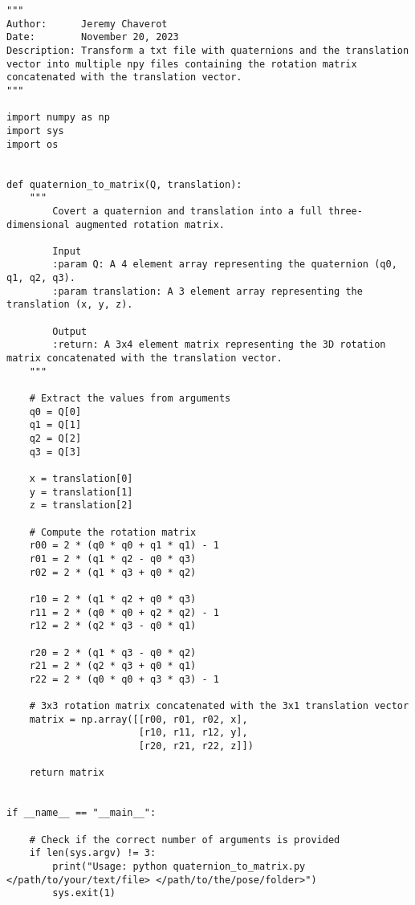 \begin{lstlisting}[style=pythonstyle, label=lst:4, caption=Python script \texttt{quaternion\_to\_matrix.py} to transform a txt file with quaternions and the translation vector into multiple npy files containing the rotation matrix augmented with the translation vector.]
"""
Author:      Jeremy Chaverot
Date:        November 20, 2023
Description: Transform a txt file with quaternions and the translation vector into multiple npy files containing the rotation matrix concatenated with the translation vector.
"""

import numpy as np
import sys
import os


def quaternion_to_matrix(Q, translation):
    """
        Covert a quaternion and translation into a full three-dimensional augmented rotation matrix.

        Input
        :param Q: A 4 element array representing the quaternion (q0, q1, q2, q3).
        :param translation: A 3 element array representing the translation (x, y, z).

        Output
        :return: A 3x4 element matrix representing the 3D rotation matrix concatenated with the translation vector.
    """

    # Extract the values from arguments
    q0 = Q[0]
    q1 = Q[1]
    q2 = Q[2]
    q3 = Q[3]

    x = translation[0]
    y = translation[1]
    z = translation[2]

    # Compute the rotation matrix
    r00 = 2 * (q0 * q0 + q1 * q1) - 1
    r01 = 2 * (q1 * q2 - q0 * q3)
    r02 = 2 * (q1 * q3 + q0 * q2)

    r10 = 2 * (q1 * q2 + q0 * q3)
    r11 = 2 * (q0 * q0 + q2 * q2) - 1
    r12 = 2 * (q2 * q3 - q0 * q1)

    r20 = 2 * (q1 * q3 - q0 * q2)
    r21 = 2 * (q2 * q3 + q0 * q1)
    r22 = 2 * (q0 * q0 + q3 * q3) - 1

    # 3x3 rotation matrix concatenated with the 3x1 translation vector
    matrix = np.array([[r00, r01, r02, x],
                       [r10, r11, r12, y],
                       [r20, r21, r22, z]])

    return matrix


if __name__ == "__main__":

    # Check if the correct number of arguments is provided
    if len(sys.argv) != 3:
        print("Usage: python quaternion_to_matrix.py </path/to/your/text/file> </path/to/the/pose/folder>")
        sys.exit(1)


\end{lstlisting}

